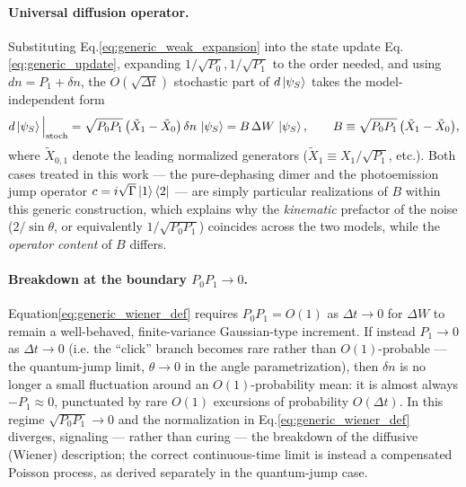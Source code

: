 \documentclass[a4paper,12pt]{article}
\begin{document}
\paragraph{Universal diffusion operator.}
Substituting Eq.\ref{eq:generic_weak_expansion} into the state update Eq.\ref{eq:generic_update}, expanding $1/\sqrt{P_0}, 1/\sqrt{P_1}$ to the order needed, and using $dn = P_1+\delta n$, the $O(\sqrt{\Delta t})$ stochastic part of $d\ket{\psi_S}$ takes the model-independent form
\begin{equation}
	d\ket{\psi_S}\Big|_{\text{stoch}} = \sqrt{P_{0}P_{1}}\,\big(\tilde X_{1}-\tilde X_{0}\big)\,\delta n\,\ket{\psi_S} = B\,\Delta W\,\ket{\psi_S}, \qquad B \equiv \sqrt{P_{0}P_{1}}\,\big(\tilde X_{1}-\tilde X_{0}\big),
	\label{eq:generic_B_operator}
\end{equation}
where $\tilde X_{0,1}$ denote the leading normalized generators ($\tilde X_1 \equiv X_1/\sqrt{P_1}$, etc.). Both cases treated in this work — the pure-dephasing dimer and the photoemission jump operator $c=i\sqrt\Gamma\ket1\bra2$ — are simply particular realizations of $B$ within this generic construction, which explains why the \emph{kinematic} prefactor of the noise ($2/\sin\theta$, or equivalently $1/\sqrt{P_0P_1}$) coincides across the two models, while the \emph{operator content} of $B$ differs.

\paragraph{Breakdown at the boundary $P_0P_1\to0$.}
Equation\ref{eq:generic_wiener_def} requires $P_0P_1=O(1)$ as $\Delta t\to0$ for $\Delta W$ to remain a well-behaved, finite-variance Gaussian-type increment. If instead $P_1\to0$ as $\Delta t\to0$ (i.e. the ``click'' branch becomes rare rather than $O(1)$-probable — the quantum-jump limit, $\theta\to0$ in the angle parametrization), then $\delta n$ is no longer a small fluctuation around an $O(1)$-probability mean: it is almost always $-P_1\approx0$, punctuated by rare $O(1)$ excursions of probability $O(\Delta t)$. In this regime $\sqrt{P_0P_1}\to0$ and the normalization in Eq.\ref{eq:generic_wiener_def} diverges, signaling — rather than curing — the breakdown of the diffusive (Wiener) description; the correct continuous-time limit is instead a compensated Poisson process, as derived separately in the quantum-jump case.

\newpage
\end{document}
